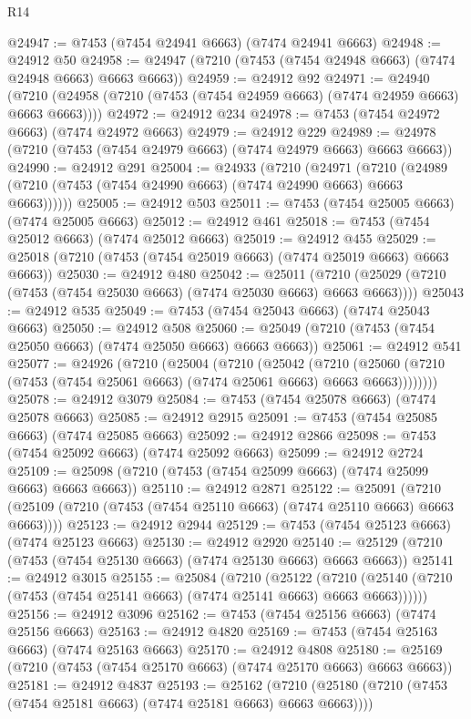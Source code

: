 \begin{lexlean}{R14}
\begin{coremodule}
@24947 := @7453 (@7454 @24941 @6663) (@7474 @24941 @6663)
@24948 := @24912 @50
@24958 := @24947 (@7210 (@7453 (@7454 @24948 @6663) (@7474 @24948 @6663) @6663 @6663))
@24959 := @24912 @92
@24971 := @24940
    (@7210 (@24958 (@7210 (@7453 (@7454 @24959 @6663) (@7474 @24959 @6663) @6663 @6663))))
@24972 := @24912 @234
@24978 := @7453 (@7454 @24972 @6663) (@7474 @24972 @6663)
@24979 := @24912 @229
@24989 := @24978 (@7210 (@7453 (@7454 @24979 @6663) (@7474 @24979 @6663) @6663 @6663))
@24990 := @24912 @291
@25004 := @24933
    (@7210
      (@24971
        (@7210 (@24989 (@7210 (@7453 (@7454 @24990 @6663) (@7474 @24990 @6663) @6663 @6663))))))
@25005 := @24912 @503
@25011 := @7453 (@7454 @25005 @6663) (@7474 @25005 @6663)
@25012 := @24912 @461
@25018 := @7453 (@7454 @25012 @6663) (@7474 @25012 @6663)
@25019 := @24912 @455
@25029 := @25018 (@7210 (@7453 (@7454 @25019 @6663) (@7474 @25019 @6663) @6663 @6663))
@25030 := @24912 @480
@25042 := @25011
    (@7210 (@25029 (@7210 (@7453 (@7454 @25030 @6663) (@7474 @25030 @6663) @6663 @6663))))
@25043 := @24912 @535
@25049 := @7453 (@7454 @25043 @6663) (@7474 @25043 @6663)
@25050 := @24912 @508
@25060 := @25049 (@7210 (@7453 (@7454 @25050 @6663) (@7474 @25050 @6663) @6663 @6663))
@25061 := @24912 @541
@25077 := @24926
    (@7210
      (@25004
        (@7210
          (@25042
            (@7210
              (@25060 (@7210 (@7453 (@7454 @25061 @6663) (@7474 @25061 @6663) @6663 @6663))))))))
@25078 := @24912 @3079
@25084 := @7453 (@7454 @25078 @6663) (@7474 @25078 @6663)
@25085 := @24912 @2915
@25091 := @7453 (@7454 @25085 @6663) (@7474 @25085 @6663)
@25092 := @24912 @2866
@25098 := @7453 (@7454 @25092 @6663) (@7474 @25092 @6663)
@25099 := @24912 @2724
@25109 := @25098 (@7210 (@7453 (@7454 @25099 @6663) (@7474 @25099 @6663) @6663 @6663))
@25110 := @24912 @2871
@25122 := @25091
    (@7210 (@25109 (@7210 (@7453 (@7454 @25110 @6663) (@7474 @25110 @6663) @6663 @6663))))
@25123 := @24912 @2944
@25129 := @7453 (@7454 @25123 @6663) (@7474 @25123 @6663)
@25130 := @24912 @2920
@25140 := @25129 (@7210 (@7453 (@7454 @25130 @6663) (@7474 @25130 @6663) @6663 @6663))
@25141 := @24912 @3015
@25155 := @25084
    (@7210
      (@25122
        (@7210 (@25140 (@7210 (@7453 (@7454 @25141 @6663) (@7474 @25141 @6663) @6663 @6663))))))
@25156 := @24912 @3096
@25162 := @7453 (@7454 @25156 @6663) (@7474 @25156 @6663)
@25163 := @24912 @4820
@25169 := @7453 (@7454 @25163 @6663) (@7474 @25163 @6663)
@25170 := @24912 @4808
@25180 := @25169 (@7210 (@7453 (@7454 @25170 @6663) (@7474 @25170 @6663) @6663 @6663))
@25181 := @24912 @4837
@25193 := @25162
    (@7210 (@25180 (@7210 (@7453 (@7454 @25181 @6663) (@7474 @25181 @6663) @6663 @6663))))

\end{coremodule}
\end{lexlean}
